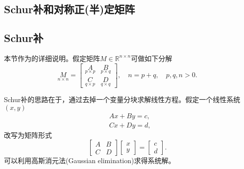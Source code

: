 

\begin{subappendices}

\section{Schur补和对称正(半)定矩阵}
\label{sec:simple-schur-decomp-matrix}

\subsection{Schur补}
\label{sec:simple-schur-decomp-method}
本节作为\cite[A.5.5.5]{Boyd:2004jr}的详细说明。假定矩阵$M \in \mathbb{R}^{n \times n}$可做如下分解
\begin{equation*}
  \underset{n \times n}{M} = \begin{bmatrix}
  \underset{p \times p}{A} & \underset{p \times q}{B} \\
  \underset{q \times p}{C} & \underset{q \times q}{D}
  \end{bmatrix}, \quad n= p + q, \quad p,q,n > 0.
\end{equation*}

Schur补的思路在于，通过去掉一个变量分块求解线性方程。假定一个线性系统$(x,y)$
\begin{subequations}
  \begin{align}
    \label{eq:simple-schur-equation-sys-ABc}
    &A x + B y = c, \\
    \label{eq:simple-schur-equation-sys-CDd}
    &C x + D y = d,
  \end{align}
\end{subequations}
改写为矩阵形式
\begin{equation}
  \label{eq:simple-schur-equation-matrix-form}
  \begin{bmatrix}
    A & B \\ C & D
  \end{bmatrix} \begin{bmatrix}
  x \\ y
\end{bmatrix} = \begin{bmatrix}
c \\ d
\end{bmatrix}.
\end{equation}
可以利用高斯消元法(Gaussian elimination)求得系统解。


\end{subappendices}
